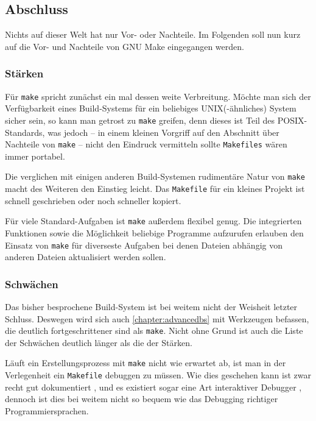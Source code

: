 \subsection{Abschluss}

Nichts auf dieser Welt hat nur Vor- oder Nachteile. Im Folgenden soll nun kurz
auf die Vor- und Nachteile von GNU Make eingegangen werden.

\subsubsection{Stärken}

Für \texttt{make} spricht zunächst ein mal dessen weite Verbreitung. Möchte man
sich der Verfügbarkeit eines Build-Systems für ein beliebiges UNIX(-ähnliches)
System sicher sein, so kann man getrost zu \texttt{make} greifen, denn dieses
ist Teil des POSIX-Standards, was jedoch -- in einem kleinen Vorgriff auf den
Abschnitt über Nachteile von \texttt{make} -- nicht den Eindruck vermitteln
sollte \texttt{Makefiles} wären immer portabel.

Die verglichen mit einigen anderen Build-Systemen rudimentäre Natur von
\texttt{make} macht des Weiteren den Einstieg leicht. Das \texttt{Makefile} für
ein kleines Projekt ist schnell geschrieben oder noch schneller kopiert.

Für viele Standard-Aufgaben ist \texttt{make} außerdem flexibel genug. Die
integrierten Funktionen sowie die Möglichkeit beliebige Programme aufzurufen
erlauben den Einsatz von \texttt{make} für diverseste Aufgaben bei denen Dateien
abhängig von anderen Dateien aktualisiert werden sollen.

\subsubsection{Schwächen} 

Das bisher besprochene Build-System ist bei weitem nicht der Weisheit letzter
Schluss. Deswegen wird sich auch \autoref{chapter:advancedbs} mit
Werkzeugen befassen, die deutlich fortgeschrittener sind als \texttt{make}.
Nicht ohne Grund ist auch die Liste der Schwächen deutlich länger als die der
Stärken.

Läuft ein Erstellungsprozess mit \texttt{make} nicht wie erwartet ab, ist man in
der Verlegenheit ein \texttt{Makefile} debuggen zu müssen. Wie dies geschehen
kann ist zwar recht gut dokumentiert ,
und es existiert sogar eine Art interaktiver Debugger ,
dennoch ist dies bei weitem nicht so bequem wie das Debugging richtiger
Programmiersprachen.

